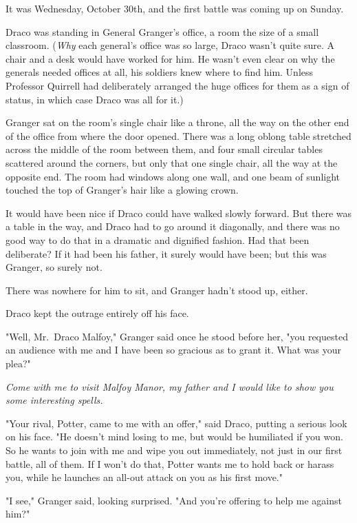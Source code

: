 It was Wednesday, October 30th, and the first battle was coming up on Sunday.

Draco was standing in General Granger's office, a room the size of a small 
classroom. (\emph{Why} each general's office was so large, Draco wasn't quite 
sure. A chair and a desk would have worked for him. He wasn't even clear on why 
the generals needed offices at all, his soldiers knew where to find him. Unless 
Professor Quirrell had deliberately arranged the huge offices for them as a 
sign of status, in which case Draco was all for it.)

Granger sat on the room's single chair like a throne, all the way on the other 
end of the office from where the door opened. There was a long oblong table 
stretched across the middle of the room between them, and four small circular 
tables scattered around the corners, but only that one single chair, all the 
way at the opposite end. The room had windows along one wall, and one beam of 
sunlight touched the top of Granger's hair like a glowing crown.

It would have been nice if Draco could have walked slowly forward. But there 
was a table in the way, and Draco had to go around it diagonally, and there was 
no good way to do that in a dramatic and dignified fashion. Had that been 
deliberate? If it had been his father, it surely would have been; but this was 
Granger, so surely not.

There was nowhere for him to sit, and Granger hadn't stood up, either.

Draco kept the outrage entirely off his face.

"Well, Mr.~Draco Malfoy," Granger said once he stood before her, "you requested 
an audience with me and I have been so gracious as to grant it. What was your 
plea?"

\emph{Come with me to visit Malfoy Manor, my father and I would like to show 
you some interesting spells.\\
}

"Your rival, Potter, came to me with an offer," said Draco, putting a serious 
look on his face. "He doesn't mind losing to me, but would be humiliated if you 
won. So he wants to join with me and wipe you out immediately, not just in our 
first battle, all of them. If I won't do that, Potter wants me to hold back or 
harass you, while he launches an all-out attack on you as his first move."

"I see," Granger said, looking surprised. "And you're offering to help me 
against him?"

